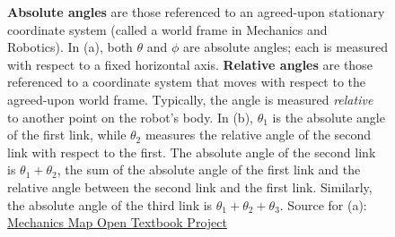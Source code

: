 \begin{figure}[tb]%
\centering
{}%
\hfill
{}%
\hfill
\caption[]{
\textbf{Absolute angles} are those referenced to an agreed-upon stationary coordinate system (called a world frame in Mechanics and Robotics). In (a), both $\theta$ and $\phi$ are absolute angles; each is measured with respect to a fixed horizontal axis. \textbf{Relative angles} are those referenced to a coordinate system that moves with respect to the agreed-upon world frame. Typically, the angle is measured \textit{relative} to another point on the robot's body. In (b), $\theta_1$ is the absolute angle of the first link, while $\theta_2$ measures the relative angle of the second link with respect to the first. The absolute angle of the second link is $\theta_1 + \theta_2$, the sum of the absolute angle of the first link and the relative angle between the second link and the first link.  Similarly, the absolute angle of the third link is $\theta_1 + \theta_2 + \theta_3$. Source for (a): \href{http://mechanicsmap.psu.edu/websites/12_rigid_body_kinematics/12-4_absolute_motion_analysis/absolute_motion_analysis.html}{Mechanics Map Open Textbook Project} 
} 
    \label{fig:RobotAbsoluteAngle}
\end{figure}

